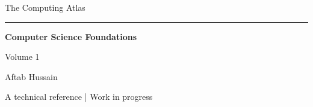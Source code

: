\documentclass[11pt,oneside,openany]{book}
\begin{document}
\frontmatter
\begin{titlepage}
\centering
\vspace*{3.7cm}
{\Large The Computing Atlas\par}
\vspace{0.65cm}
\rule{0.6\textwidth}{0.5pt}\par
\vspace{0.75cm}
{\Huge\bfseries Computer Science Foundations\par}
\vspace{1.0cm}
{\large Volume 1\par}
\vfill
{\large Aftab Hussain\par}
\vspace{0.6cm}
{\small A technical reference | Work in progress\par}
\vspace{1.2cm}
\end{titlepage}
\tableofcontents
\mainmatter

\end{document}
